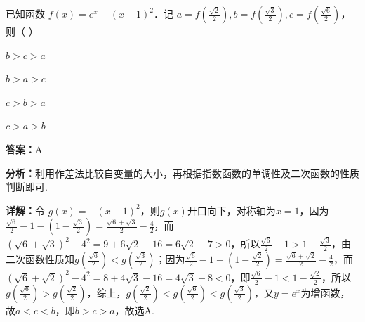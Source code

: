 \begin{question}[points=5]
已知函数 $f(x)=e^x-(x-1)^2$．记 $a=f\left(\frac{\sqrt{2}}{2}\right), b=f\left(\frac{\sqrt{3}}{2}\right), c=f\left(\frac{\sqrt{6}}{2}\right)$，则（    ）
\begin{choices}
  \item $b>c>a$
  \item $b>a>c$
  \item $c>b>a$
  \item $c>a>b$
\end{choices}
\begin{solution}
\textbf{答案：}A

\textbf{分析：}利用作差法比较自变量的大小，再根据指数函数的单调性及二次函数的性质判断即可.

\textbf{详解：}令 $g(x)=-(x-1)^2$，则$g(x)$开口向下，对称轴为$x=1$，因为$\frac{\sqrt{6}}{2}-1-(1-\frac{\sqrt{3}}{2})=\frac{\sqrt{6}+\sqrt{3}}{2}-\frac{4}{2}$，而$(\sqrt{6}+\sqrt{3})^2-4^2=9+6\sqrt{2}-16=6\sqrt{2}-7>0$，所以$\frac{\sqrt{6}}{2}-1>1-\frac{\sqrt{3}}{2}$，由二次函数性质知$g(\frac{\sqrt{6}}{2})<g(\frac{\sqrt{3}}{2})$；因为$\frac{\sqrt{6}}{2}-1-(1-\frac{\sqrt{2}}{2})=\frac{\sqrt{6}+\sqrt{2}}{2}-\frac{4}{2}$，而$(\sqrt{6}+\sqrt{2})^2-4^2=8+4\sqrt{3}-16=4\sqrt{3}-8<0$，即$\frac{\sqrt{6}}{2}-1<1-\frac{\sqrt{2}}{2}$，所以$g(\frac{\sqrt{6}}{2})>g(\frac{\sqrt{2}}{2})$，综上，$g(\frac{\sqrt{2}}{2})<g(\frac{\sqrt{6}}{2})<g(\frac{\sqrt{3}}{2})$，又$y=e^x$为增函数，故$a<c<b$，即$b>c>a$，故选A.
\end{solution}
\end{question}


